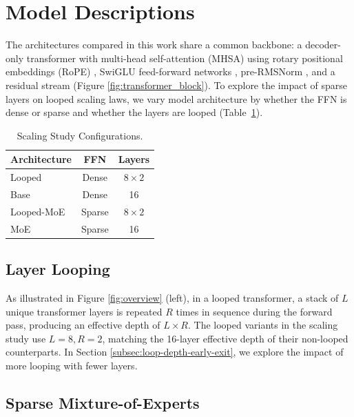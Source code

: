 \documentclass{article}
\begin{document}
\section{Model Descriptions}

The architectures compared in this work share a common backbone: a decoder-only transformer with multi-head self-attention (MHSA) using rotary positional embeddings (RoPE) \citep{su_roformer_2023}, SwiGLU feed-forward networks \citep{shazeer_glu_2020}, pre-RMSNorm \citep{zhang_root_2019}, and a residual stream (Figure \ref{fig:transformer_block}). To explore the impact of sparse layers on looped scaling laws, we vary model architecture by whether the FFN is dense or sparse and whether the layers are looped (Table~\ref{tab:architectures}). 

\begin{table}
\vskip -0.30in
\centering
\caption{Scaling Study Configurations.}
\label{tab:architectures}
\vskip -0.1in
\begin{tabular}{lcc}
\toprule
Architecture & FFN & Layers \\
\midrule
Looped   & Dense       & $8 \times 2$ \\
Base          & Dense       & 16 \\
Looped-MoE & Sparse  & $8 \times 2$ \\
MoE         & Sparse  & 16 \\ 
\bottomrule
\end{tabular}
\vskip -0.15in
\end{table}

\subsection{Layer Looping}

As illustrated in Figure \ref{fig:overview} (left), in a looped transformer, a stack of $L$ unique transformer layers is repeated $R$ times in sequence during the forward pass, producing an effective depth of $L \times R$. The looped variants in the scaling study use $L{=}8, R{=}2$, matching the 16-layer effective depth of their non-looped counterparts. In Section \ref{subsec:loop-depth-early-exit}, we explore the impact of more looping with fewer layers. 

\subsection{Sparse Mixture-of-Experts}
\end{document}

